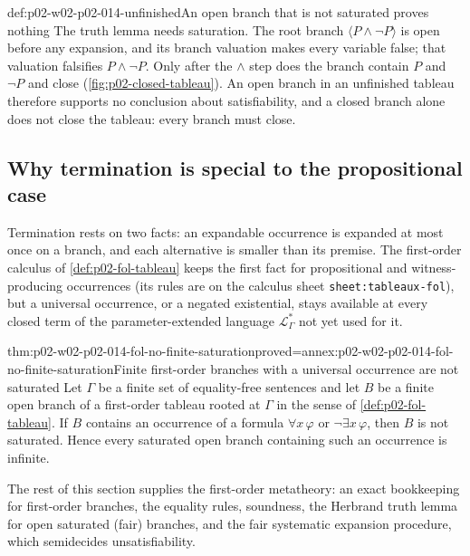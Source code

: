\begin{hbwarning}{def:p02-w02-p02-014-unfinished}{An open branch that is not saturated proves nothing}
The truth lemma needs saturation.  The root branch \(\langle P\land\neg
P\rangle\) is open before any expansion, and its branch valuation makes every
variable false; that valuation falsifies \(P\land\neg P\).  Only after the
\(\land\) step does the branch contain \(P\) and \(\neg P\) and close
(\cref{fig:p02-closed-tableau}).  An open branch in an unfinished tableau
therefore supports no conclusion about satisfiability, and a closed branch
alone does not close the tableau: every branch must close.
\end{hbwarning}

\subsection{Why termination is special to the propositional case}
\label{sec:p02-w02-p02-014-fol-contrast}

Termination rests on two facts: an expandable occurrence is expanded at most
once on a branch, and each alternative is smaller than its premise.  The
first-order calculus of \cref{def:p02-fol-tableau} keeps the first fact
for propositional and witness-producing occurrences (its rules are on the
calculus sheet \texttt{sheet:\allowbreak tableaux-fol}), but a universal occurrence, or a negated
existential, stays available at every closed term of the parameter-extended
language \(\mathcal L_{\Gamma}^{*}\) not yet used for it.

\begin{hblemma}{thm:p02-w02-p02-014-fol-no-finite-saturation}{proved=annex:p02-w02-p02-014-fol-no-finite-saturation}{Finite first-order branches with a universal occurrence are not saturated}
Let \(\Gamma\) be a finite set of equality-free sentences and let \(B\) be a
finite open branch of a first-order tableau rooted at \(\Gamma\) in the sense
of \cref{def:p02-fol-tableau}.  If \(B\) contains an occurrence of a formula
\(\forall x\,\varphi\) or \(\neg\exists x\,\varphi\), then \(B\) is not
saturated.  Hence every saturated open branch containing such an occurrence
is infinite.
\end{hblemma}

The rest of this section supplies the first-order metatheory: an exact
bookkeeping for first-order branches, the equality rules, soundness, the
Herbrand truth lemma for open saturated (fair) branches, and the fair
systematic expansion procedure, which semidecides unsatisfiability.


